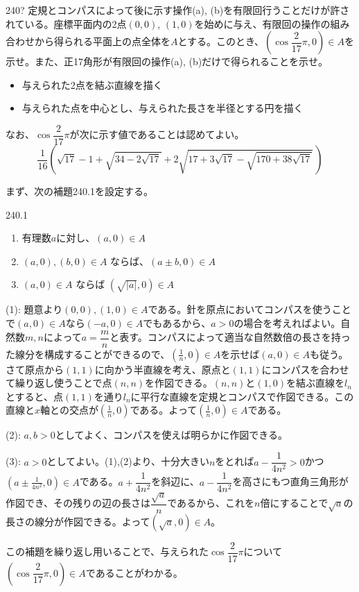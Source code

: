 \begin{prob}{240}{\hosi ?}{}
 定規とコンパスによって後に示す操作(a), (b)を有限回行うことだけが許されている。座標平面内の2点$(0,0)$, $(1,0)$を始めに与え、有限回の操作の組み合わせから得られる平面上の点全体を$A$とする。このとき、$(\cos\dfrac{2}{17}\pi,0)\in A$を示せ。また、正17角形が有限回の操作(a), (b)だけで得られることを示せ。

 \begin{itemize}
  \setlength{\leftskip}{3eM}
  \item[操作(a)] 与えられた2点を結ぶ直線を描く
  \item[操作(b)] 与えられた点を中心とし、与えられた長さを半径とする円を描く
 \end{itemize}

 なお、$\cos\dfrac{2}{17}\pi$が次に示す値であることは認めてよい。
 \[ \!\!\frac{1}{16}\!\!\left(\!\sqrt{17}-1\!+\!\sqrt{34-2\sqrt{17}}+2\sqrt{17\!+\!3\sqrt{17}\!-\!\sqrt{170\!+\!38\sqrt{17}}}\,\right) \]
\end{prob}

まず、次の補題240.1を設定する。
\begin{subthm}{240.1}
 \begin{enumerate}
  \item 有理数$a$に対し、$(a,0)\in A$
  \item $(a,0), (b,0) \in A$ ならば、$(a\pm b, 0) \in A$
  \item $(a,0)\in A$ ならば $(\sqrt{|a|},0) \in A$
 \end{enumerate}
\end{subthm}
(1): 題意より$(0,0), (1,0) \in A$である。針を原点においてコンパスを使うことで$(a,0)\in A$なら$(-a,0) \in A$でもあるから、$a>0$の場合を考えればよい。自然数$m,n$によって$a=\dfrac{m}{n}$と表す。コンパスによって適当な自然数倍の長さを持った線分を構成することができるので、$(\frac{1}{n},0)\in A$を示せば$(a,0)\in A$も従う。さて原点から$(1,1)$に向かう半直線を考え、原点と$(1,1)$にコンパスを合わせて繰り返し使うことで点$(n,n)$を作図できる。$(n,n)$と$(1,0)$を結ぶ直線を$l_n$とすると、点$(1,1)$を通り$l_n$に平行な直線を定規とコンパスで作図できる。この直線と$x$軸との交点が$(\frac{1}{n},0)$である。よって$(\frac{1}{n},0)\in A$である。

(2): $a,b>0$としてよく、コンパスを使えば明らかに作図できる。

(3): $a>0$としてよい。(1),(2)より、十分大きい$n$をとれば$a-\dfrac{1}{4n^2}>0$かつ $(a\pm\frac{1}{4n^2},0) \in A$である。$a+\dfrac{1}{4n^2}$を斜辺に、$a-\dfrac{1}{4n^2}$を高さにもつ直角三角形が作図でき、その残りの辺の長さは$\dfrac{\sqrt{a}}{n}$であるから、これを$n$倍にすることで$\sqrt{a}$の長さの線分が作図できる。よって$(\sqrt{a},0) \in A$。

この補題を繰り返し用いることで、与えられた$\cos\dfrac{2}{17}\pi$について$(\cos\dfrac{2}{17}\pi,0) \in A$であることがわかる。